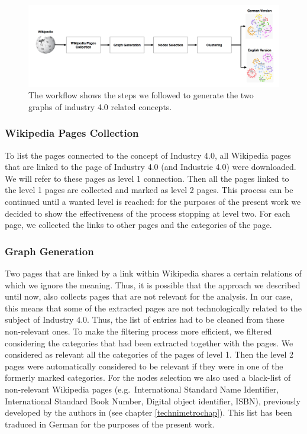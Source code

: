\documentclass[]{book}
\theoremstyle{definition}
\theoremstyle{definition}
\theoremstyle{definition}
\theoremstyle{remark}
\begin{document}
\begin{figure}

{\centering \includegraphics[width=1\linewidth]{_bookdown_files/figures/industrie_wf} 

}

\caption{The workflow shows the steps we followed to generate the two graphs of industry 4.0 related concepts.}\label{fig:industriewf}
\end{figure}

\subsubsection*{Wikipedia Pages
Collection}\label{wikipedia-pages-collection}

To list the pages connected to the concept of Industry 4.0, all
Wikipedia pages that are linked to the page of Industry 4.0 (and
Industrie 4.0) were downloaded. We will refer to these pages as level 1
connection. Then all the pages linked to the level 1 pages are collected
and marked as level 2 pages. This process can be continued until a
wanted level is reached: for the purposes of the present work we decided
to show the effectiveness of the process stopping at level two. For each
page, we collected the links to other pages and the categories of the
page.

\subsubsection*{Graph Generation}\label{graph-generation}

Two pages that are linked by a link within Wikipedia shares a certain
relations of which we ignore the meaning. Thus, it is possible that the
approach we described until now, also collects pages that are not
relevant for the analysis. In our case, this means that some of the
extracted pages are not technologically related to the subject of
Industry 4.0. Thus, the list of entries had to be cleaned from these
non-relevant ones. To make the filtering process more efficient, we
filtered considering the categories that had been extracted together
with the pages. We considered as relevant all the categories of the
pages of level 1. Then the level 2 pages were automatically considered
to be relevant if they were in one of the formerly marked categories.
For the nodes selection we also used a black-list of non-relevant
Wikipedia pages (e.g.~International Standard Name Identifier,
International Standard Book Number, Digital object identifier, ISBN),
previously developed by the authors in (see chapter
\ref{technimetrochap}). This list has been traduced in German for the
purposes of the present work.
\end{document}
